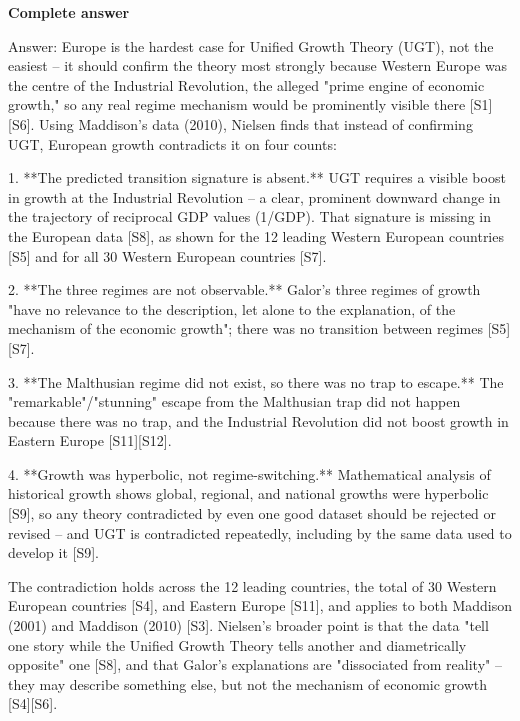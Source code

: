 \documentclass[10pt]{article}
\begin{document}
\textbf{Complete answer}
\begin{AnswerText}
Answer: Europe is the hardest case for Unified Growth Theory (UGT), not the easiest -- it should confirm the theory most strongly because Western Europe was the centre of the Industrial Revolution, the alleged "prime engine of economic growth," so any real regime mechanism would be prominently visible there [S1][S6]. Using Maddison's data (2010), Nielsen finds that instead of confirming UGT, European growth contradicts it on four counts:

1. **The predicted transition signature is absent.** UGT requires a visible boost in growth at the Industrial Revolution -- a clear, prominent downward change in the trajectory of reciprocal GDP values (1/GDP). That signature is missing in the European data [S8], as shown for the 12 leading Western European countries [S5] and for all 30 Western European countries [S7].

2. **The three regimes are not observable.** Galor's three regimes of growth "have no relevance to the description, let alone to the explanation, of the mechanism of the economic growth"; there was no transition between regimes [S5][S7].

3. **The Malthusian regime did not exist, so there was no trap to escape.** The "remarkable"/"stunning" escape from the Malthusian trap did not happen because there was no trap, and the Industrial Revolution did not boost growth in Eastern Europe [S11][S12].

4. **Growth was hyperbolic, not regime-switching.** Mathematical analysis of historical growth shows global, regional, and national growths were hyperbolic [S9], so any theory contradicted by even one good dataset should be rejected or revised -- and UGT is contradicted repeatedly, including by the same data used to develop it [S9].

The contradiction holds across the 12 leading countries, the total of 30 Western European countries [S4], and Eastern Europe [S11], and applies to both Maddison (2001) and Maddison (2010) [S3]. Nielsen's broader point is that the data "tell one story while the Unified Growth Theory tells another and diametrically opposite" one [S8], and that Galor's explanations are "dissociated from reality" -- they may describe something else, but not the mechanism of economic growth [S4][S6].
\end{AnswerText}
\end{document}

